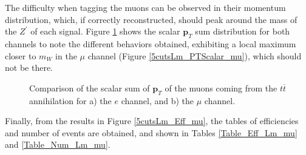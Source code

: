 The difficulty when tagging the muons can be observed in their momentum distribution, which, if correctly reconstructed, should peak around the mass of the $Z^{\prime}$ of each signal. Figure \ref{5cutsLm_PTs} shows the scalar $\bm{p}_T$ sum distribution for both channels to note the different behaviors obtained, exhibiting a local maximum closer to $m_{W}$ in the $\mu$ channel (Figure \ref{5cutsLm_PTScalar_mu}), which should not be there.

\begin{figure}[ht!]
     \begin{center}
    \end{center}
    \vspace{-1\baselineskip}
    \caption{Comparison of the scalar sum of $\bm{p}_T$ of the muons coming from the $t\overline t$ annihilation for a) the $e$ channel, and b) the $\mu$ channel.} 
   \label{5cutsLm_PTs}
\end{figure}

Finally, from the results in Figure \ref{5cutsLm_Eff_mu}, the tables of efficiencies and number of events are obtained, and shown in Tables \ref{Table_Eff_Lm_mu} and \ref{Table_Num_Lm_mu}.

